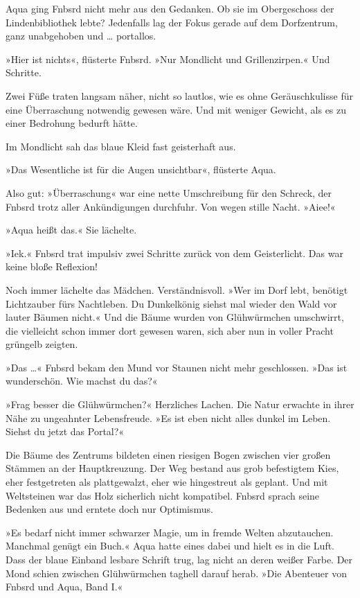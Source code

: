 Aqua ging Fnbsrd nicht mehr aus den Gedanken. Ob sie im Obergeschoss der Lindenbibliothek lebte? Jedenfalls lag der Fokus gerade auf dem Dorfzentrum, ganz unabgehoben und … portallos.

»Hier ist nichts«, flüsterte Fnbsrd. »Nur Mondlicht und Grillenzirpen.« Und Schritte.

Zwei Füße traten langsam näher, nicht so lautlos, wie es ohne Geräuschkulisse für eine Überraschung notwendig gewesen wäre. Und mit weniger Gewicht, als es zu einer Bedrohung bedurft hätte.

Im Mondlicht sah das blaue Kleid fast geisterhaft aus.

»Das Wesentliche ist für die Augen unsichtbar«, flüsterte Aqua.

Also gut: »Überraschung« war eine nette Umschreibung für den Schreck, der Fnbsrd trotz aller Ankündigungen durchfuhr. Von wegen stille Nacht. »Aiee!«

»Aqua heißt das.« Sie lächelte.

»Iek.« Fnbsrd trat impulsiv zwei Schritte zurück von dem Geisterlicht. Das war keine bloße Reflexion!

Noch immer lächelte das Mädchen. Verständnisvoll. »Wer im Dorf lebt, benötigt Lichtzauber fürs Nachtleben. Du Dunkelkönig siehst mal wieder den Wald vor lauter Bäumen nicht.« Und die Bäume wurden von Glühwürmchen umschwirrt, die vielleicht schon immer dort gewesen waren, sich aber nun in voller Pracht grüngelb zeigten.

»Das …« Fnbsrd bekam den Mund vor Staunen nicht mehr geschlossen. »Das ist wunderschön. Wie machst du das?«

»Frag besser die Glühwürmchen?« Herzliches Lachen. Die Natur erwachte in ihrer Nähe zu ungeahnter Lebensfreude. »Es ist eben nicht alles dunkel im Leben. Siehst du jetzt das Portal?«

Die Bäume des Zentrums bildeten einen riesigen Bogen zwischen vier großen Stämmen an der Hauptkreuzung. Der Weg bestand aus grob befestigtem Kies, eher festgetreten als plattgewalzt, eher wie hingestreut als geplant. Und mit Weltsteinen war das Holz sicherlich nicht kompatibel. Fnbsrd sprach seine Bedenken aus und erntete doch nur Optimismus.

»Es bedarf nicht immer schwarzer Magie, um in fremde Welten abzutauchen. Manchmal genügt ein Buch.« Aqua hatte eines dabei und hielt es in die Luft. Dass der blaue Einband lesbare Schrift trug, lag nicht an deren weißer Farbe. Der Mond schien zwischen Glühwürmchen taghell darauf herab. »Die Abenteuer von Fnbsrd und Aqua, Band I.«

